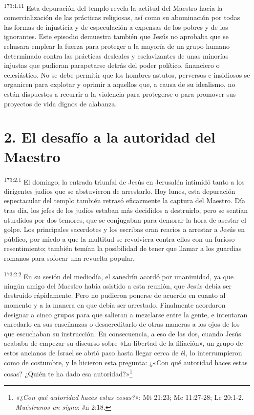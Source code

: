 \par
\textsuperscript{173:1.11} Esta depuración del templo revela la actitud del Maestro hacia la comercialización de las prácticas religiosas, así como su abominación por todas las formas de injusticia y de especulación a expensas de los pobres y de los ignorantes. Este episodio demuestra también que Jesús no aprobaba que se rehusara emplear la fuerza para proteger a la mayoría de un grupo humano determinado contra las prácticas desleales y esclavizantes de unas minorías injustas que pudieran parapetarse detrás del poder político, financiero o eclesiástico. No se debe permitir que los hombres astutos, perversos e insidiosos se organicen para explotar y oprimir a aquellos que, a causa de su idealismo, no están dispuestos a recurrir a la violencia para protegerse o para promover sus proyectos de vida dignos de alabanza.

\section*{2. El desafío a la autoridad del Maestro}
\par
\textsuperscript{173:2.1} El domingo, la entrada triunfal de Jesús en Jerusalén intimidó tanto a los dirigentes judíos que se abstuvieron de arrestarlo. Hoy lunes, esta depuración espectacular del templo también retrasó eficazmente la captura del Maestro. Día tras día, los jefes de los judíos estaban más decididos a destruirlo, pero se sentían aturdidos por dos temores, que se conjugaban para demorar la hora de asestar el golpe. Los principales sacerdotes y los escribas eran reacios a arrestar a Jesús en público, por miedo a que la multitud se revolviera contra ellos con un furioso resentimiento; también temían la posibilidad de tener que llamar a los guardias romanos para sofocar una revuelta popular.

\par
\textsuperscript{173:2.2} En su sesión del mediodía, el sanedrín acordó por unanimidad, ya que ningún amigo del Maestro había asistido a esta reunión, que Jesús debía ser destruido rápidamente. Pero no pudieron ponerse de acuerdo en cuanto al momento y a la manera en que debía ser arrestado. Finalmente acordaron designar a cinco grupos para que salieran a mezclarse entre la gente, e intentaran enredarlo en sus enseñanzas o desacreditarlo de otras maneras a los ojos de los que escuchaban su instrucción. En consecuencia, a eso de las dos, cuando Jesús acababa de empezar su discurso sobre «La libertad de la filiación», un grupo de estos ancianos de Israel se abrió paso hasta llegar cerca de él, lo interrumpieron como de costumbre, y le hicieron esta pregunta: ¿«Con qué autoridad haces estas cosas? ¿Quién te ha dado esa autoridad?»\footnote{\textit{«¿Con qué autoridad haces estas cosas?»}: Mt 21:23; Mc 11:27-28; Lc 20:1-2. \textit{Muéstranos un signo}: Jn 2:18.}

